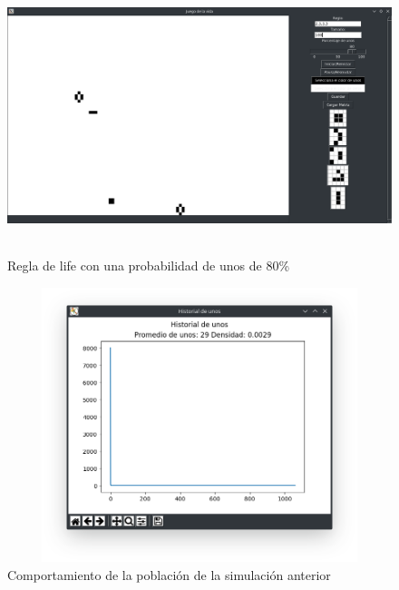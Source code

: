 \begin{figure}[H]
\begin{center}
 \includegraphics[width=12cm, height=8cm]{./img/life80.png}
 \caption{Regla de life con una probabilidad de unos de 80\%}
 \label{fig:life80}
\end{center}
\end{figure}

\begin{figure}[H]
\begin{center}
 \includegraphics[width=12cm, height=8cm]{./img/life80grafica.png}
 \caption{Comportamiento de la población de la simulación anterior}
 \label{fig:life80grafica}
\end{center}
\end{figure}

